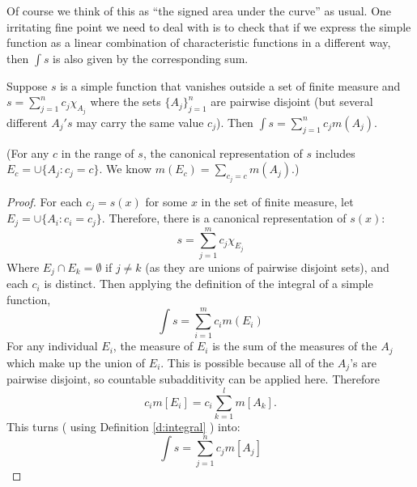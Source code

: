 \begin{rmk}%
	Of course we think of this as ``the signed area under the curve'' as usual. 
	One irritating fine point we need to deal with is to check that if we express 
	the simple function as a linear combination of characteristic functions in a 
	different way, then $\int s$ is also given by the corresponding sum. 
\end{rmk}

\begin{pblm}\label{p:simplefuncint}%
	Suppose $s$ is a simple function that vanishes outside a set of finite 
	measure and $s = \sum\limits_{j=1}^nc_j\chi_{A_j}$ where the sets $\{A_j\}_{j=1}^n$ 
	are pairwise disjoint (but several different $A_j's$ may carry the same value $c_j$). 
	Then $\int s = \sum\limits_{j=1}^n c_j m(A_j).$ 

	\noindent (For any $c$ in the range of $s$, the canonical representation of $s$ 
	includes $E_c = \cup\{A_j: c_j = c\}$. We know $m(E_c) = \sum\limits_{c_j = c} m(A_j).$)
\begin{proof}
	For each $c_{j} = s(x)$ for some $x$ in the set of finite measure, let 
	$E_{j} = \cup\{ A_{i}: c_{i} = c_{j} \}$. 
	Therefore, there is a canonical representation of $s(x)$: 
	\begin{equation*}
		s = \sum\limits_{j=1}^{m} c_{j}\chi_{E_j}
	\end{equation*}	
	Where $E_{j} \cap E_{k} = \emptyset$ if $j \neq k$ 
	(as they are unions of pairwise disjoint sets), 
	and each $c_{i}$ is distinct.  Then applying the definition of the 
	integral of a simple function,
	\begin{equation*}
		\int s = \sum_{i=1}^{m} c_{i}m(E_{i}) 		
	\end{equation*}
	For any individual $E_{i}$, the measure of $E_{i}$ is the sum of the measures 
	of the $A_{j}$ which make up the union of $E_{i}$.  This is possible because all of 
	the $A_{j}$'s are pairwise disjoint, so countable subadditivity can be applied here. 
	Therefore 
	\begin{equation*}
		c_{i}m[E_{i}] = c_{i}\sum_{k=1}^{l}m[A_{k}]	.
	\end{equation*}
	This turns ( using Definition \ref{d:integral} ) into:
	\begin{equation*}
		\int s = \sum_{j=1}^{n}c_{j}m[A_{j}]
	\end{equation*}
\end{proof}
\end{pblm}

\pagebreak

